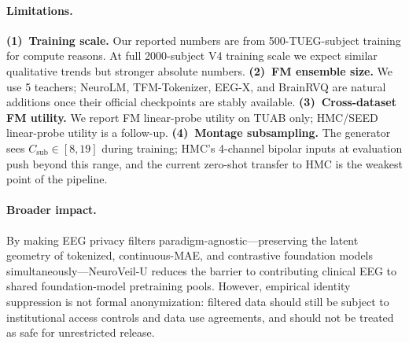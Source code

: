 \paragraph{Limitations.}
\textbf{(1)~Training scale.} Our reported numbers are from 500-TUEG-subject training for compute reasons. At full 2000-subject V4 training scale we expect similar qualitative trends but stronger absolute numbers. \textbf{(2)~FM ensemble size.} We use 5 teachers; NeuroLM, TFM-Tokenizer, EEG-X, and BrainRVQ are natural additions once their official checkpoints are stably available. \textbf{(3)~Cross-dataset FM utility.} We report FM linear-probe utility on TUAB only; HMC/SEED linear-probe utility is a follow-up. \textbf{(4)~Montage subsampling.} The generator sees $C_{\text{sub}}\!\in\![8,19]$ during training; HMC's 4-channel bipolar inputs at evaluation push beyond this range, and the current zero-shot transfer to HMC is the weakest point of the pipeline.

\paragraph{Broader impact.} By making EEG privacy filters paradigm-agnostic---preserving the latent geometry of tokenized, continuous-MAE, and contrastive foundation models simultaneously---NeuroVeil-U reduces the barrier to contributing clinical EEG to shared foundation-model pretraining pools. However, empirical identity suppression is not formal anonymization: filtered data should still be subject to institutional access controls and data use agreements, and should not be treated as safe for unrestricted release.
